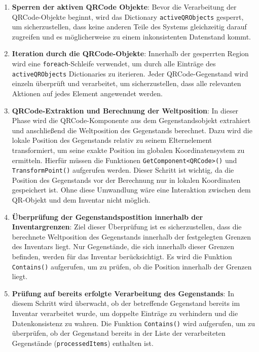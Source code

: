 \begin{enumerate}
    \item \textbf{Sperren der aktiven QRCode Objekte}:
    Bevor die Verarbeitung der QRCode-Objekte beginnt, wird das Dictionary \texttt{activeQRObjects} gesperrt, um
    sicherzustellen, dass keine anderen Teile des Systems gleichzeitig darauf zugreifen und es möglicherweise zu einem
    inkonsistenten Datenstand kommt.

    \item \textbf{Iteration durch die QRCode-Objekte}:
    Innerhalb der gesperrten Region wird eine \texttt{foreach}-Schleife verwendet, um durch alle Einträge des
    \texttt{activeQRObjects} Dictionaries zu iterieren. Jeder QRCode-Gegenstand wird einzeln überprüft und verarbeitet,
    um sicherzustellen, dass alle relevanten Aktionen auf jedes Element angewendet werden.

    \item \textbf{QRCode-Extraktion und Berechnung der Weltposition}:
    In dieser Phase wird die QRCode-Komponente aus dem Gegenstandsobjekt extrahiert und anschließend die Weltposition
    des Gegenstands berechnet. Dazu wird die lokale Position des Gegenstands relativ zu seinem Elternelement transformiert,
    um seine exakte Position im globalen Koordinatensystem zu ermitteln. Hierfür müssen die Funktionen
    \texttt{GetComponent<QRCode>()} und \texttt{TransformPoint()} aufgerufen werden. Dieser Schritt ist wichtig, da die
    Position des Gegenstands vor der Berechnung nur in lokalen Koordinaten gespeichert ist. Ohne diese Umwandlung wäre
    eine Interaktion zwischen dem QR-Objekt und dem Inventar nicht möglich.

    \item \textbf{Überprüfung der Gegenstandspostition innerhalb der Inventargrenzen}:
    Ziel dieser Überprüfung ist es sicherzustellen, dass die berechnete Weltposition des Gegenstands innerhalb der
    festgelegten Grenzen des Inventars liegt. Nur Gegenstände, die sich innerhalb dieser Grenzen befinden, werden für
    das Inventar berücksichtigt. Es wird die Funktion \texttt{Contains()} aufgerufen, um zu prüfen, ob die Position
    innerhalb der Grenzen liegt.

    \item \textbf{Prüfung auf bereits erfolgte Verarbeitung des Gegenstands}:
    In diesem Schritt wird überwacht, ob der betreffende Gegenstand bereits im Inventar verarbeitet wurde, um doppelte
    Einträge zu verhindern und die Datenkonsistenz zu wahren. Die Funktion \texttt{Contains()} wird aufgerufen, um zu
    überprüfen, ob der Gegenstand bereits in der Liste der verarbeiteten Gegenstände (\texttt{processedItems}) enthalten
    ist.


\end{enumerate}
